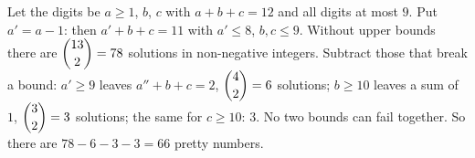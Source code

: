 Let the digits be $a\ge1$, $b$, $c$ with $a+b+c=12$ and all digits at most $9$. Put $a'=a-1$: then $a'+b+c=11$ with $a'\le8$, $b,c\le9$. Without upper bounds there are $\dbinom{13}{2}=78$ solutions in non-negative integers. Subtract those that break a bound: $a'\ge9$ leaves $a''+b+c=2$, $\dbinom42=6$ solutions; $b\ge10$ leaves a sum of $1$, $\dbinom32=3$ solutions; the same for $c\ge10$: $3$. No two bounds can fail together. So there are $78-6-3-3=\boxed{66}$ pretty numbers.
